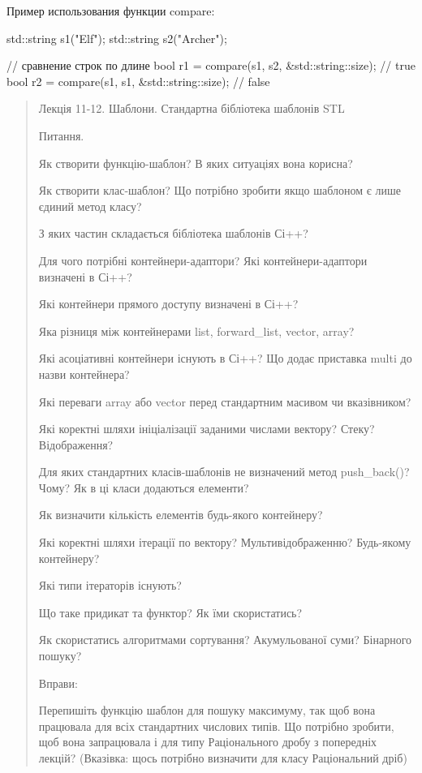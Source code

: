 \documentclass[]{article}
\begin{document}
\begin{enumerate}
Пример использования функции compare:

std::string s1("Elf");
std::string s2("Archer");

// сравнение строк по длине
bool r1 = compare(s1, s2, &std::string::size); // true
bool r2 = compare(s1, s1, &std::string::size); // false


\end{enumerate}

\begin{quote}
Лекція 11-12. Шаблони. Стандартна бібліотека шаблонів STL

\protect\hypertarget{_Hlk57989145}{}{}Питання.

Як створити функцію-шаблон? В яких ситуаціях вона корисна?

Як створити клас-шаблон? Що потрібно зробити якщо шаблоном є лише єдиний
метод класу?

З яких частин складається бібліотека шаблонів Сі++?

Для чого потрібні контейнери-адаптори? Які контейнери-адаптори визначені
в Сі++?

Які контейнери прямого доступу визначені в Сі++?

Яка різниця між контейнерами list, forward\_list, vector, array?

Які асоціативні контейнери існують в Сі++? Що додає приставка multi до
назви контейнера?

Які переваги array або vector перед стандартним масивом чи вказівником?

Які коректні шляхи ініціалізації заданими числами вектору? Стеку?
Відображення?

Для яких стандартних класів-шаблонів не визначений метод push\_back()?
Чому? Як в ці класи додаються елементи?

Як визначити кількість елементів будь-якого контейнеру?

Які коректні шляхи ітерації по вектору? Мультивідображенню? Будь-якому
контейнеру?

Які типи ітераторів існують?

Що таке придикат та функтор? Як їми скористатись?

Як скористатись алгоритмами сортування? Акумульованої суми? Бінарного
пошуку?

Вправи:

\protect\hypertarget{_Hlk65951809}{}{\protect\hypertarget{_Hlk65951788}{}{}}Перепишіть
функцію шаблон для пошуку максимуму, так щоб вона працювала для всіх
стандартних числових типів. Що потрібно зробити, щоб вона запрацювала і
для типу Раціонального дробу з попередніх лекцій? (Вказівка: щось
потрібно визначити для класу Раціональний дріб)


\end{quote}
\end{document}
